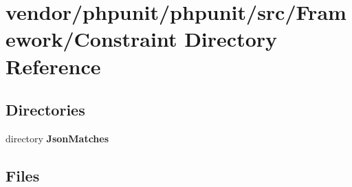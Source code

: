 \section{vendor/phpunit/phpunit/src/\+Framework/\+Constraint Directory Reference}
\label{dir_9bdb010cdb1bd2e6160b14a6f2ac99bd}
\subsection*{Directories}
\begin{DoxyCompactItemize}
\item 
directory {\bf Json\+Matches}
\end{DoxyCompactItemize}
\subsection*{Files}

